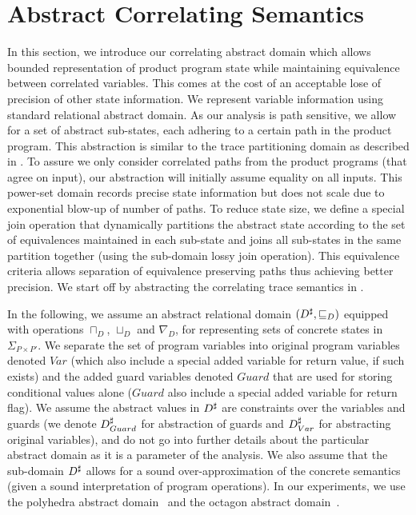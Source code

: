 \section{Abstract Correlating Semantics}

In this section, we introduce our correlating abstract domain which allows bounded representation of product program state while maintaining equivalence between correlated variables. This comes at the cost of an acceptable lose of precision of other state information. We represent variable information using standard relational abstract domain. As our analysis is path sensitive, we allow for a set of abstract sub-states, each adhering to a certain path in the product program. This abstraction is similar to the trace partitioning domain as described in \cite{MauborgneRival07}. To assure we only consider correlated paths from the product programs (that agree on input), our abstraction will initially assume equality on all inputs. This power-set domain records precise state information but does not scale due to exponential blow-up of number of paths. To reduce state size, we define a special join operation that dynamically partitions the abstract state according to the set of equivalences maintained in each sub-state and joins all sub-states in the same partition together (using the sub-domain lossy join operation). This equivalence criteria allows separation of equivalence preserving paths thus achieving better precision. We start off by abstracting the correlating trace semantics in .

In the following, we assume an abstract relational domain $(D^\sharp, \sqsubseteq_{D})$ equipped with operations $\sqcap_{D}$, $\sqcup_{D}$ and $\nabla_{D}$, for representing sets of concrete states in $\Sigma_{P \times P'}$. We separate the set of program variables into original program variables denoted $Var$ (which also include a special added variable for return value, if such exists) and the added guard variables denoted $Guard$ that are used for storing conditional values alone ($Guard$ also include a special added variable for return flag). We assume the abstract values in $D^\sharp$ are constraints over the variables and guards (we denote $D^\sharp_{Guard}$ for abstraction of guards and $D^\sharp_{Var}$ for abstracting original variables), and do not go into further details about the particular abstract domain as it is a parameter of the analysis. We also assume that the sub-domain $D^\sharp$ allows for a sound over-approximation of the concrete semantics (given a sound interpretation of program operations). In our experiments, we use the polyhedra abstract domain~\cite{CousotHalbwachs78} and the octagon abstract domain~\cite{Mine07}.

